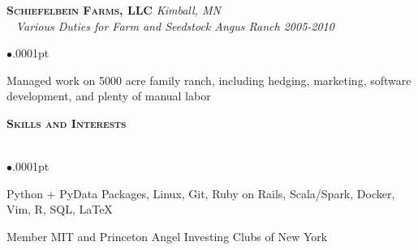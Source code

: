 \documentclass[11pt]{article}
\newcommand{\lineunder}{\vspace*{-8pt} \\ \hspace*{-18pt} \hrulefill \\}
\newcommand{\header}[1]{{\hspace*{-15pt}\vspace*{5pt} \Large \textsc{\textbf{#1}}} \vspace*{-6pt} \lineunder \vspace*{0pt} }
\newcommand{\employer}[4]{
	{\hspace*{-20pt} {\small{\textbf{\textsc{ #1}}}}
  \hfill \small{\emph{#2}}\\ ~\hspace*{-20pt} \small \emph{ #3 \hfill #4}}\\ }
\newenvironment{achievements}{\begin{list}{$\bullet$}{\topsep .0001pt \itemsep -2pt}}{\vspace*{5pt}\end{list} }
\begin{document}



\employer{Schiefelbein Farms, LLC } {Kimball, MN} {Various Duties for Farm and Seedstock Angus Ranch} {2005-2010}\nopagebreak[4]
	\begin{achievements}
		\item 	Managed work on 5000 acre family ranch, including hedging, marketing, software development, and plenty of manual labor
	\end{achievements}

\header{Skills and Interests}
	\vspace{-2pt}
	\begin{achievements}
		\item  Python + PyData Packages, Linux, Git, Ruby on Rails, Scala/Spark, Docker, Vim, R, SQL, \LaTeX{}
		\item Member MIT and Princeton Angel Investing Clubs of New York
	\end{achievements}
\end{document}
